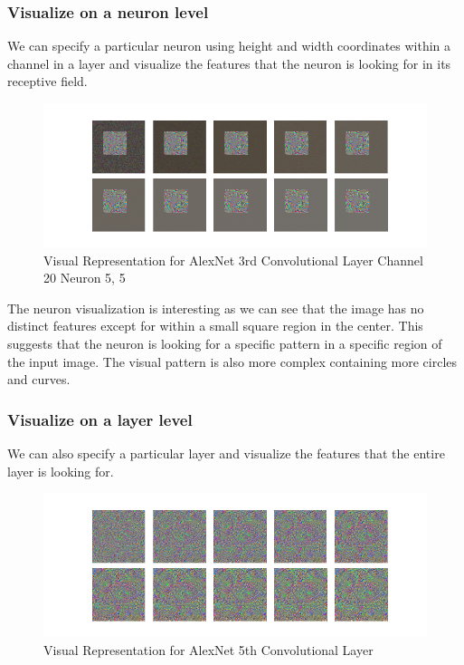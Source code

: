 \documentclass[12pt, letterpaper]{article}
\begin{document}
\subsubsection{Visualize on a neuron level}
We can specify a particular neuron using height and width coordinates within a channel in a layer and visualize the features that the neuron is looking for in its receptive field.

\begin{figure}[H]
    \centering
    \includegraphics[width=1\textwidth]{alexnet_layer6_filter20_neuron5_5.png}
    \caption{Visual Representation for AlexNet 3rd Convolutional Layer Channel 20 Neuron 5, 5}
    \label{fig:alexnet_layer6_filter20_neuron5_5}
\end{figure}

The neuron visualization is interesting as we can see that the image has no distinct features except for within a small square region in the center. This suggests that the neuron is looking for a specific pattern in a specific region of the input image. The visual pattern is also more complex containing more circles and curves. 

\subsubsection{Visualize on a layer level}
We can also specify a particular layer and visualize the features that the entire layer is looking for.

\begin{figure}[H]
    \centering
    \includegraphics[width=1\textwidth]{alexnet_layer12.png}
    \caption{Visual Representation for AlexNet 5th Convolutional Layer}
    \label{fig:alexnet_layer12}
\end{figure}
\end{document}
